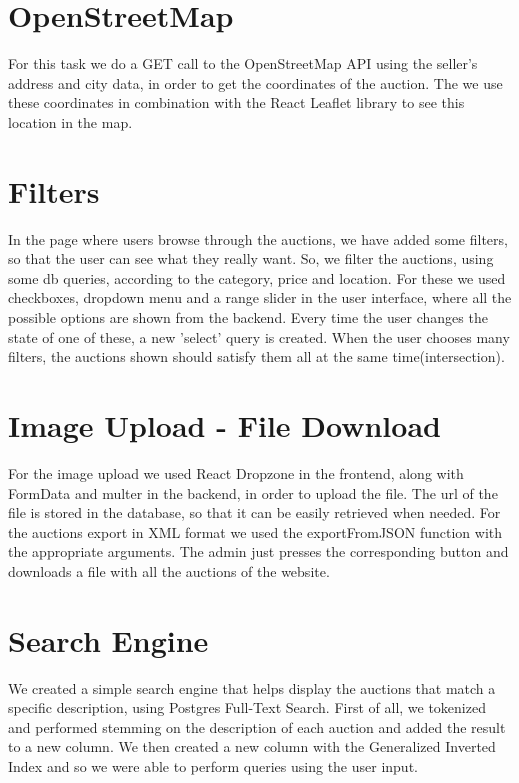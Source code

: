 \documentclass{article}
\begin{document}
\section{OpenStreetMap}
For this task we do a GET call to the OpenStreetMap API using the seller's address and city data, in order to get the coordinates of the auction. The we use these coordinates in combination with the React Leaflet library to see this location in the map. 

\section{Filters}
In the page where users browse through the auctions, we have added some filters, so that the user can see what they really want. So, we filter the auctions, using some db queries, according to the category, price and location. For these we used checkboxes, dropdown menu and a range slider in the user interface, where all the possible options are shown from the backend. Every time the user changes the state of one of these, a new 'select' query is created. When the user chooses many filters, the auctions shown should satisfy them all at the same time(intersection).

\section{Image Upload - File Download}
For the image upload we used React Dropzone in the frontend, along with FormData and multer in the backend, in order to upload the file. The url of the file is stored in the database, so that it can be easily retrieved when needed.
For the auctions export in XML format we used the exportFromJSON function with the appropriate arguments. The admin just presses the corresponding button and downloads a file with all the auctions of the website.

\section{Search Engine}
We created a simple search engine that helps display the auctions that match a specific description, using Postgres Full-Text Search. First of all, we tokenized and performed stemming on the description of each auction and added the result to a new column. We then created a new column with the Generalized Inverted Index and so we were able to perform queries using the user input.
\end{document}

